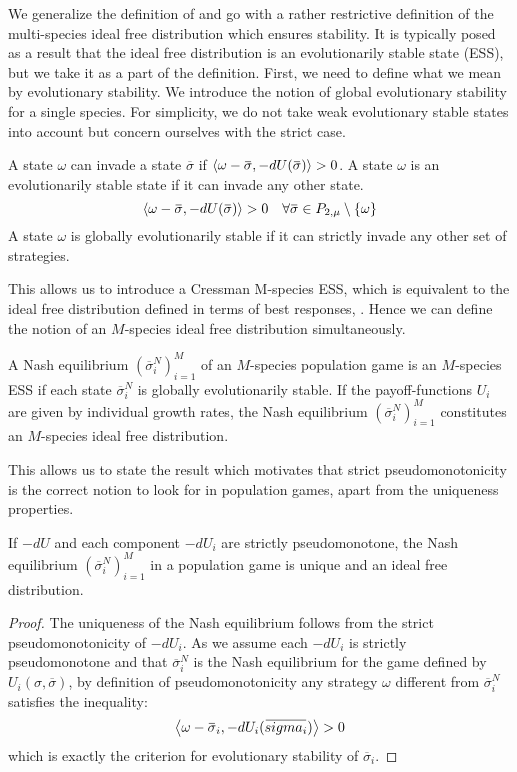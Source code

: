 We generalize the definition of \citep{kvrivan2008ideal} and go with a rather restrictive definition of the multi-species ideal free distribution which ensures stability. It is typically posed as a result that the ideal free distribution is an evolutionarily stable state (ESS), but we take it as a part of the definition. First, we need to define what we mean by evolutionary stability. We introduce the notion of global evolutionary stability for a single species. For simplicity, we do not take weak evolutionary stable states into account but concern ourselves with the strict case.
\begin{definition}
  A state $\omega$ can invade a state $\overbar{\sigma}$ if $\ip{\omega - \overbar{\sigma}}{-dU(\overbar{\sigma})} > 0$. A state $\omega$ is an evolutionarily stable state if it can invade any other state.
  \begin{equation}
    \ip{\omega- \overbar{\sigma}}{-dU( \overbar{\sigma})} > 0 \quad \forall  \overbar{\sigma} \in P_{2,\mu} \setminus \{\omega \}
  \end{equation}
  A state $\omega$ is globally evolutionarily stable if it can strictly invade any other set of strategies.
\end{definition}
This allows us to introduce a Cressman M-species ESS, which is equivalent to the ideal free distribution defined in terms of best responses, \citet[Section 3.3]{kvrivan2008ideal}. Hence we can define the notion of an $M$-species ideal free distribution simultaneously.
\begin{definition}
  A Nash equilibrium $(\overbar{\sigma}^N_i)_{i=1}^M$ of an $M$-species population game is an $M$-species ESS if each state $\overbar{\sigma}^N_i$ is globally evolutionarily stable. If the payoff-functions $U_i$ are given by individual growth rates, the Nash equilibrium $(\overbar{\sigma}^N_i)_{i=1}^M$ constitutes an $M$-species ideal free distribution.
\end{definition}
This allows us to state the result which motivates that strict pseudomonotonicity is the correct notion to look for in population games, apart from the uniqueness properties.
\begin{theorem}
  If $-dU$ and each component $-dU_i$ are strictly pseudomonotone, the Nash equilibrium $(\overbar{\sigma}_i^N)_{i=1}^M$ in a population game is unique and an ideal free distribution.
\end{theorem}
\begin{proof}
  The uniqueness of the Nash equilibrium follows from the strict pseudomonotonicity of $-dU_i$. As we assume each $-dU_i$ is strictly pseudomonotone and that $\overbar{\sigma}^N_i$ is the Nash equilibrium for the game defined by $U_i(\sigma,\overbar{\sigma})$, by definition of pseudomonotonicity any strategy $\omega$ different from $\overbar{\sigma}^N_i$ satisfies the inequality:
  \begin{equation}
    \ip{\omega-\overbar{\sigma}_i}{-dU_i(\overbar{sigma_i})} > 0
  \end{equation}
  which is exactly the criterion for evolutionary stability of $\overbar{\sigma}_i$.
\end{proof}


